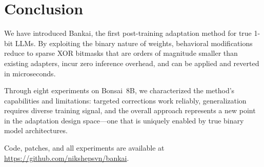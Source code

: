 \documentclass[11pt,a4paper]{article}
\begin{document}
\section{Conclusion}

We have introduced Bankai, the first post-training adaptation method for
true 1-bit LLMs. By exploiting the binary nature of weights, behavioral
modifications reduce to sparse XOR bitmasks that are orders of magnitude
smaller than existing adapters, incur zero inference overhead, and can be
applied and reverted in microseconds.

Through eight experiments on Bonsai~8B, we characterized the method's
capabilities and limitations: targeted corrections work reliably,
generalization requires diverse training signal, and the overall approach
represents a new point in the adaptation design space---one that is
uniquely enabled by true binary model architectures.

Code, patches, and all experiments are available at
\url{https://github.com/nikshepsvn/bankai}.
\end{document}
